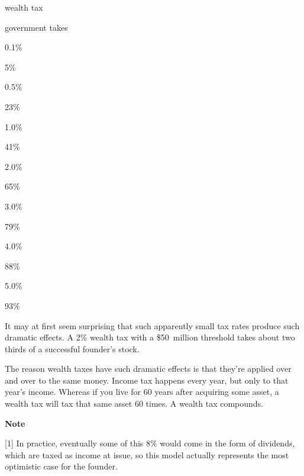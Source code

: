 wealth tax

government takes

0.1\%

5\%

0.5\%

23\%

1.0\%

41\%

2.0\%

65\%

3.0\%

79\%

4.0\%

88\%

5.0\%

93\%

It may at first seem surprising that such apparently small tax rates
produce such dramatic effects. A 2\% wealth tax with a \$50~million
threshold takes about two thirds of a successful founder's stock.

The reason wealth taxes have such dramatic effects is that they're
applied over and over to the same money. Income tax happens every year,
but only to that year's income. Whereas if you live for 60 years after
acquiring some asset, a wealth tax will tax that same asset 60 times. A
wealth tax compounds.

\textbf{Note}

{[}1{]} In practice, eventually some of this 8\% would come in the form
of dividends, which are taxed as income at issue, so this model actually
represents the most optimistic case for the founder.
